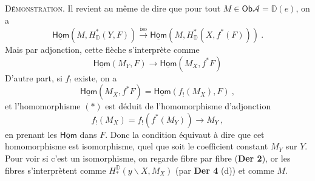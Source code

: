 \documentclass[11pt]{article}
\newcommand{\Ob}{\mathsf{Ob}}
\newcommand{\DD}{\mathbb{D}}
\newcommand{\Hom}{\underline{\mathsf{Hom}}}
\newcommand{\cA}{\mathcal{A}}
\begin{document}
\noindent\textsc{Démonstration}. Il revient au même de dire que pour tout $M \in \Ob \cA = \DD(e)$, on a
\[
\Hom(M, H^*_{\DD}(Y, F)) \overset{\mathrm{iso}}{\longrightarrow} \Hom(M, H^*_{\DD}(X, f^*(F))) \ .
\]
Mais par adjonction, cette flèche s'interprète comme
\[
\Hom(M_Y, F) \longrightarrow \Hom(M_X, f^*F) \tag*{$(*)$}
\]
D'autre part, si $f_!$ existe, on a
\[
\Hom(M_X, f^*F) = \Hom(f_!(M_X), F) \ ,
\]
et l'homomorphisme $(*)$ est déduit de l'homomorphisme d'adjonction
\[
f_!(M_X) = f_!(f^*(M_Y)) \longrightarrow M_Y \ , \tag*{$(**)$}
\]
en prenant les $\Hom$ dans $F$. Donc la condition équivaut à dire que cet homomorphisme est isomorphisme, quel que soit le coefficient constant $M_Y$ sur $Y$. Pour voir si c'est un isomorphisme, on regarde fibre par fibre (\textbf{Der 2}), or les fibres s'interprètent comme $H^{\DD}_*(y\backslash X, M_X)$ (par \textbf{Der 4} (d)) et comme $M$.
\end{document}

